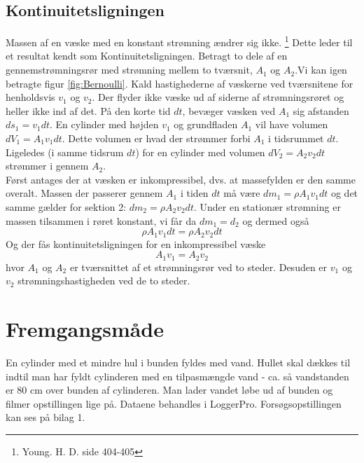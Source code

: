 \documentclass[a4paper, 11pt]{article}
\begin{document}
\subsection{Kontinuitetsligningen}
Massen af en væske med en konstant strømning ændrer sig ikke. \footnote{Young. H. D. side 404-405}
Dette leder til et resultat kendt som Kontinuitetsligningen. Betragt to dele af en gennemstrømningsrør med strømning mellem to tværsnit, \(A_1\) og \(A_2\).Vi kan igen betragte figur \ref{fig:Bernoulli}.
Kald hastighederne af væskerne ved tværsnitene for henholdsvis \(v_1\) og \(v_2\).
Der flyder ikke væske ud af siderne af strømningsrøret og heller ikke ind af det. 
På den korte tid \(dt\), bevæger væsken ved \(A_1\) sig afstanden \(ds_1=v_1 dt\). En cylinder med højden \(v_1\) og grundfladen \(A_1\) vil have volumen \(dV_1=A_1 v_1 dt\). 
Dette volumen er hvad der strømmer forbi \(A_1\) i tidsrummet \(dt\). Ligeledes (i samme tidsrum \(dt\)) for en cylinder med volumen \(dV_2=A_2v_2 dt\) strømmer i gennem \(A_2\).\\
Først antages der at væsken er inkompressibel, dvs. at massefylden er den samme overalt. Massen der passerer gennem \(A_1\) i tiden \(dt\) må være \(dm_1=\rho A_1 v_1 dt\) og det samme gælder for sektion 2: \(dm_2=\rho A_2 v_2 dt\). 
Under en stationær strømning er massen tilsammen i røret konstant, vi får da \(dm_1=d_2\) og dermed også 
\[\rho A_1 v_1 dt= \rho A_2 v_2 dt\]
Og der fås kontinuitetsligningen for en inkompressibel væske
\begin{equation}
    A_1 v_1 = A_2 v_2
\end{equation}
hvor \(A_1\) og \(A_2\) er tværsnittet af et strømningsrør ved to steder. Desuden er \(v_1\) og \(v_2\) strømningshastigheden ved de to steder. 
\section{Fremgangsmåde}
En cylinder med et mindre hul i bunden fyldes med vand. Hullet skal dækkes til indtil man har fyldt cylinderen med en tilpasmængde vand - ca. så vandstanden er 80 cm over bunden af cylinderen.
Man lader vandet løbe ud af bunden og filmer opstillingen lige på. Dataene behandles i LoggerPro. Forsøgsopstillingen kan ses på bilag 1.
\end{document}
